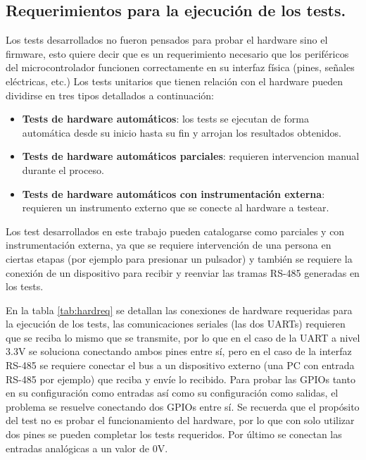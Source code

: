\subsection{Requerimientos para la ejecución de los tests.}
\label{sec:requerimientosEjecucionTests}

Los tests desarrollados no fueron pensados para probar el hardware sino el firmware, esto quiere decir que es un requerimiento necesario que los periféricos del microcontrolador funcionen correctamente en su interfaz física (pines, señales eléctricas, etc.)
Los tests unitarios que tienen relación con el hardware pueden dividirse en tres tipos\cite{tdd} detallados a continuación:

\begin{itemize}
	\item \textbf{Tests de hardware automáticos}: los tests se ejecutan de forma automática desde su inicio hasta su fin y arrojan los resultados obtenidos.
	\item \textbf{Tests de hardware automáticos parciales}: requieren intervencion manual durante el proceso.
	\item \textbf{Tests de hardware automáticos con instrumentación externa}: requieren un instrumento externo que se conecte al hardware a testear.
\end{itemize}

Los test desarrollados en este trabajo pueden catalogarse como parciales y con instrumentación externa, ya que se requiere intervención de una persona en ciertas etapas (por ejemplo para presionar un pulsador) y también se requiere la conexión de un dispositivo para recibir y reenviar las tramas RS-485 generadas en los tests.

En la tabla \ref{tab:hardreq} se detallan las conexiones de hardware requeridas para la ejecución de los tests, las comunicaciones seriales (las dos UARTs) requieren que se reciba lo mismo que se transmite, por lo que en el caso de la UART a nivel 3.3V se soluciona conectando ambos pines entre sí, pero en el caso de la interfaz RS-485 se requiere conectar el bus a un dispositivo externo (una PC con entrada RS-485 por ejemplo) que reciba y envíe lo recibido.
Para probar las GPIOs tanto en su configuración como entradas así como su configuración como salidas, el problema se resuelve conectando dos GPIOs entre sí. Se recuerda que el propósito del test no es probar el funcionamiento del hardware, por lo que con solo utilizar dos pines se pueden completar los tests requeridos. Por último se conectan las entradas analógicas a un valor de 0V.

